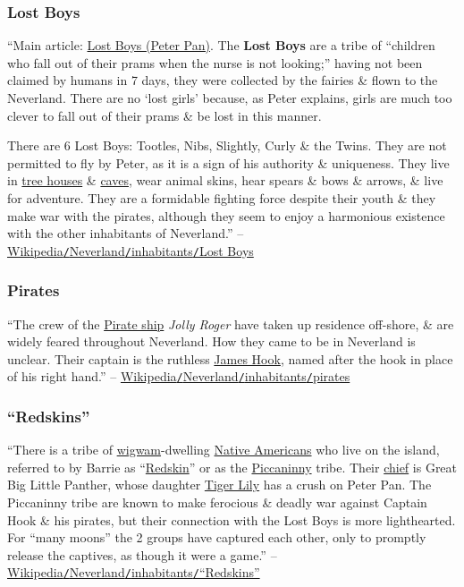 \documentclass[oneside]{book}
\numberwithin{equation}{section}
\begin{document}
\subsubsection{Lost Boys}
``Main article: \href{https://en.wikipedia.org/wiki/Lost_Boys_(Peter_Pan)}{Lost Boys (Peter Pan)}. The \textbf{Lost Boys} are a tribe of ``children who fall out of their prams when the nurse is not looking;'' having not been claimed by humans in 7 days, they were collected by the fairies \& flown to the Neverland. There are no `lost girls' because, as Peter explains, girls are much too clever to fall out of their prams \& be lost in this manner.

There are 6 Lost Boys: Tootles, Nibs, Slightly, Curly \& the Twins. They are not permitted to fly by Peter, as it is a sign of his authority \& uniqueness. They live in \href{https://en.wikipedia.org/wiki/Tree_house}{tree houses} \& \href{https://en.wikipedia.org/wiki/Cave}{caves}, wear animal skins, hear spears \& bows \& arrows, \& live for adventure. They are a formidable fighting force despite their youth \& they make war with the pirates, although they seem to enjoy a harmonious existence with the other inhabitants of Neverland.'' -- \href{https://en.wikipedia.org/wiki/Neverland#Lost_Boys}{Wikipedia\texttt{/}Neverland\texttt{/}inhabitants\texttt{/}Lost Boys}

\subsubsection{Pirates}
``The crew of the \href{https://en.wikipedia.org/wiki/Pirate_ship}{Pirate ship} \textit{Jolly Roger} have taken up residence off-shore, \& are widely feared throughout Neverland. How they came to be in Neverland is unclear. Their captain is the ruthless \href{https://en.wikipedia.org/wiki/Captain_Hook}{James Hook}, named after the hook in place of his right hand.'' -- \href{https://en.wikipedia.org/wiki/Neverland#Pirates}{Wikipedia\texttt{/}Neverland\texttt{/}inhabitants\texttt{/}pirates}

\subsubsection{``Redskins''}
``There is a tribe of \href{https://en.wikipedia.org/wiki/Wigwam}{wigwam}-dwelling \href{https://en.wikipedia.org/wiki/Native_Americans_in_the_United_States}{Native Americans} who live on the island, referred to by Barrie as ``\href{https://en.wikipedia.org/wiki/Redskin}{Redskin}'' or as the \href{https://en.wikipedia.org/wiki/Pickaninny}{Piccaninny} tribe. Their \href{https://en.wikipedia.org/wiki/Tribal_chief}{chief} is Great Big Little Panther, whose daughter \href{https://en.wikipedia.org/wiki/Tiger_Lily_(Peter_Pan)}{Tiger Lily} has a crush on Peter Pan. The Piccaninny tribe are known to make ferocious \& deadly war against Captain Hook \& his pirates, but their connection with the Lost Boys is more lighthearted. For ``many moons'' the 2 groups have captured each other, only to promptly release the captives, as though it were a game.'' -- \href{https://en.wikipedia.org/wiki/Neverland#%22Redskins%22}{Wikipedia\texttt{/}Neverland\texttt{/}inhabitants\texttt{/}``Redskins''}
\end{document}
